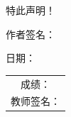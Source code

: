\documentclass[12pt,a4paper]{article}
\begin{document}
\vspace{1cm}

\noindent 特此声明！

\vspace{3cm}

\noindent 作者签名：\hrulefill

\vspace{1cm}

\noindent 日期：\hrulefill

\vspace{2cm}

\begin{flushright}
    \begin{tabular}{c}
        成绩：\hrulefill \\[1.5em]
        教师签名：\hrulefill
    \end{tabular}
\end{flushright}

\newpage

\newpage
\printbibliography
\end{document}
